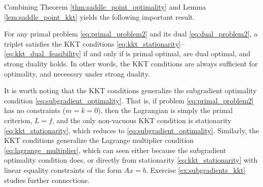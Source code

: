 Combining Theorem \ref{thm:saddle_point_optimality} and Lemma
\ref{lem:saddle_point_kkt} yields the following important result. 

\begin{Theorem}
\label{thm:kkt_optimality}
For any primal problem \eqref{eq:primal_problem2} and its dual
\eqref{eq:dual_problem2}, a triplet 
satisfies the KKT conditions
\eqref{eq:kkt_stationarity}--\eqref{eq:kkt_dual_feasibility} if and only if 
 is primal optimal,  are dual
optimal, and strong duality holds. In other words, the KKT conditions are always
sufficient for optimality, and necessary under strong duality.   
\end{Theorem}

It is worth noting that the KKT conditions generalize the subgradient optimality
condition \eqref{eq:subgradient_optimality}. That is, if problem
\eqref{eq:primal_problem2} has no constraints ($m = k = 0$), then the Lagrangian
is simply the primal criterion, $L = f$, and the only non-vacuous KKT condition
is stationarity \eqref{eq:kkt_stationarity}, which reduces to
\eqref{eq:subgradient_optimality}. Similarly, the KKT conditions generalize the
Lagrange multiplier condition \eqref{eq:lagrange_multiplier}, which can seen
either because the subgradient optimality condition does, or directly from
stationarity \eqref{eq:kkt_stationarity} with linear equality constraints of the
form $Ax = b$. Exercise \ref{ex:subgradients_kkt} studies further connections.  

